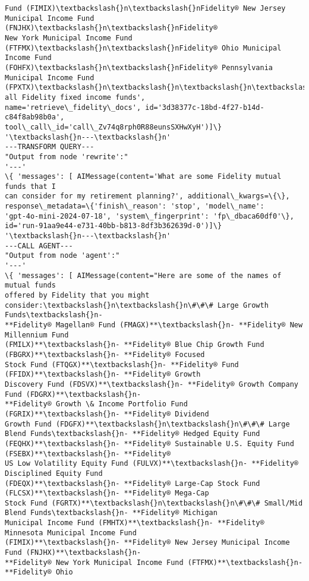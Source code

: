 \documentclass[11pt]{article}
\begin{document}
\begin{Verbatim}[commandchars=\\\{\}]
Fund (FIMIX)\textbackslash{}n\textbackslash{}nFidelity® New Jersey Municipal Income Fund (FNJHX)\textbackslash{}n\textbackslash{}nFidelity®
New York Municipal Income Fund (FTFMX)\textbackslash{}n\textbackslash{}nFidelity® Ohio Municipal Income Fund
(FOHFX)\textbackslash{}n\textbackslash{}nFidelity® Pennsylvania Municipal Income Fund
(FPXTX)\textbackslash{}n\textbackslash{}n\textbackslash{}n\textbackslash{}n\textbackslash{}nResearch all Fidelity fixed income funds',
name='retrieve\_fidelity\_docs', id='3d38377c-18bd-4f27-b14d-c84f8ab98b0a',
tool\_call\_id='call\_Zv74q8rph0R88eunsSXHwXyH')]\}
'\textbackslash{}n---\textbackslash{}n'
---TRANSFORM QUERY---
"Output from node 'rewrite':"
'---'
\{ 'messages': [ AIMessage(content='What are some Fidelity mutual funds that I
can consider for my retirement planning?', additional\_kwargs=\{\},
response\_metadata=\{'finish\_reason': 'stop', 'model\_name':
'gpt-4o-mini-2024-07-18', 'system\_fingerprint': 'fp\_dbaca60df0'\},
id='run-91aa9e44-e731-40bb-b813-8df3b362639d-0')]\}
'\textbackslash{}n---\textbackslash{}n'
---CALL AGENT---
"Output from node 'agent':"
'---'
\{ 'messages': [ AIMessage(content="Here are some of the names of mutual funds
offered by Fidelity that you might consider:\textbackslash{}n\textbackslash{}n\#\#\# Large Growth Funds\textbackslash{}n-
**Fidelity® Magellan® Fund (FMAGX)**\textbackslash{}n- **Fidelity® New Millennium Fund
(FMILX)**\textbackslash{}n- **Fidelity® Blue Chip Growth Fund (FBGRX)**\textbackslash{}n- **Fidelity® Focused
Stock Fund (FTQGX)**\textbackslash{}n- **Fidelity® Fund (FFIDX)**\textbackslash{}n- **Fidelity® Growth
Discovery Fund (FDSVX)**\textbackslash{}n- **Fidelity® Growth Company Fund (FDGRX)**\textbackslash{}n-
**Fidelity® Growth \& Income Portfolio Fund (FGRIX)**\textbackslash{}n- **Fidelity® Dividend
Growth Fund (FDGFX)**\textbackslash{}n\textbackslash{}n\#\#\# Large Blend Funds\textbackslash{}n- **Fidelity® Hedged Equity Fund
(FEQHX)**\textbackslash{}n- **Fidelity® Sustainable U.S. Equity Fund (FSEBX)**\textbackslash{}n- **Fidelity®
US Low Volatility Equity Fund (FULVX)**\textbackslash{}n- **Fidelity® Disciplined Equity Fund
(FDEQX)**\textbackslash{}n- **Fidelity® Large-Cap Stock Fund (FLCSX)**\textbackslash{}n- **Fidelity® Mega-Cap
Stock Fund (FGRTX)**\textbackslash{}n\textbackslash{}n\#\#\# Small/Mid Blend Funds\textbackslash{}n- **Fidelity® Michigan
Municipal Income Fund (FMHTX)**\textbackslash{}n- **Fidelity® Minnesota Municipal Income Fund
(FIMIX)**\textbackslash{}n- **Fidelity® New Jersey Municipal Income Fund (FNJHX)**\textbackslash{}n-
**Fidelity® New York Municipal Income Fund (FTFMX)**\textbackslash{}n- **Fidelity® Ohio

\end{Verbatim}
\end{document}

